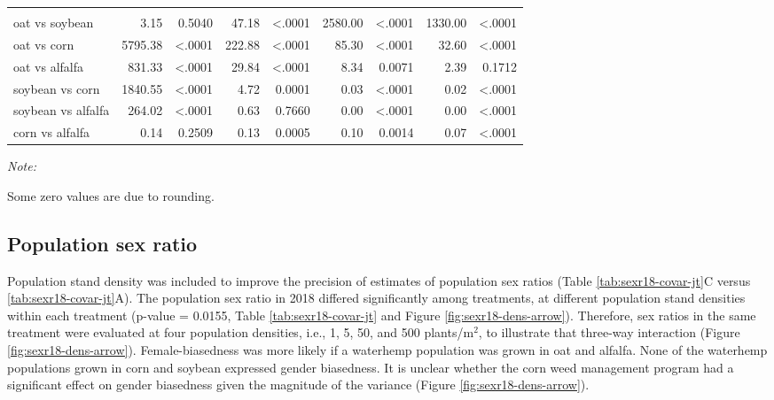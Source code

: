 \documentclass[utf8]{frontiersSCNS}
\begin{document}
\begin{table}[htbp]
\begin{threeparttable}
\begin{tabular}[t]{lrrr>{}r|rrrr}
\addlinespace[0.3em]
\multicolumn{9}{l}{\textbf{(B) - Crop species effects}}\\
\hspace{1em}oat vs soybean & 3.15 & 0.5040 & 47.18 & <.0001 & 2580.00 & <.0001 & 1330.00 & <.0001\\
\hspace{1em}oat vs corn & 5795.38 & <.0001 & 222.88 & <.0001 & 85.30 & <.0001 & 32.60 & <.0001\\
\hspace{1em}oat vs alfalfa & 831.33 & <.0001 & 29.84 & <.0001 & 8.34 & 0.0071 & 2.39 & 0.1712\\
\hspace{1em}soybean vs corn & 1840.55 & <.0001 & 4.72 & 0.0001 & 0.03 & <.0001 & 0.02 & <.0001\\
\hspace{1em}soybean vs alfalfa & 264.02 & <.0001 & 0.63 & 0.7660 & 0.00 & <.0001 & 0.00 & <.0001\\
\hspace{1em}corn vs alfalfa & 0.14 & 0.2509 & 0.13 & 0.0005 & 0.10 & 0.0014 & 0.07 & <.0001\\
\bottomrule
\end{tabular}
\begin{tablenotes}[para]
\item \textit{Note: } 
\item Some zero values are due to rounding.
\end{tablenotes}
\end{threeparttable}
\end{table}

\hypertarget{population-sex-ratio-1}{%
\subsection*{Population sex ratio}\label{population-sex-ratio-1}}

Population stand density was included to improve the precision of estimates of population sex ratios (Table \ref{tab:sexr18-covar-jt}C versus \ref{tab:sexr18-covar-jt}A). The population sex ratio in 2018 differed significantly among treatments, at different population stand densities within each treatment (p-value = 0.0155, Table \ref{tab:sexr18-covar-jt} and Figure \ref{fig:sexr18-dens-arrow}). Therefore, sex ratios in the same treatment were evaluated at four population densities, i.e., 1, 5, 50, and 500 plants/m\(^2\), to illustrate that three-way interaction (Figure \ref{fig:sexr18-dens-arrow}). Female-biasedness was more likely if a waterhemp population was grown in oat and alfalfa. None of the waterhemp populations grown in corn and soybean expressed gender biasedness. It is unclear whether the corn weed management program had a significant effect on gender biasedness given the magnitude of the variance (Figure \ref{fig:sexr18-dens-arrow}).
\end{document}
